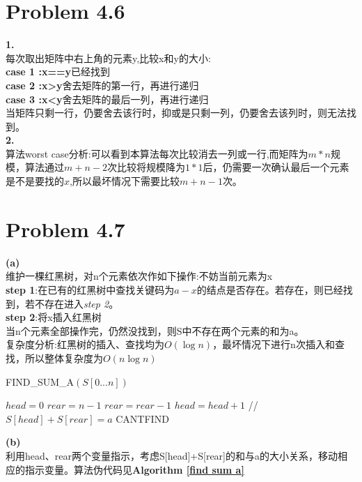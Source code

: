 \documentclass[twocolumn]{ctexart}
\begin{document}
\section*{Problem 4.6}
\noindent \textbf{1.}\\
\indent 每次取出矩阵中右上角的元素y,比较x和y的大小:\\
\indent \textbf{case 1 :x==y}已经找到\\
\indent \textbf{case 2 :x>y}舍去矩阵的第一行，再进行递归\\
\indent \textbf{case 3 :x<y}舍去矩阵的最后一列，再进行递归\\
\indent 当矩阵只剩一行，仍要舍去该行时，抑或是只剩一列，仍要舍去该列时，则无法找到。\\

\noindent \textbf{ 2.}\\
\indent 算法worst case分析:可以看到本算法每次比较消去一列或一行,而矩阵为$m*n$规模，算法通过$m+n-2$次比较将规模降为$1*1$后，仍需要一次确认最后一个元素是不是要找的$x$,所以最坏情况下需要比较$m+n-1$次。

\section*{Problem 4.7}
\noindent \textbf{(a)}\\
\indent 维护一棵红黑树，对n个元素依次作如下操作:不妨当前元素为x\\
\noindent \textbf{step 1}:在已有的红黑树中查找关键码为$a-x$的结点是否存在。若存在，则已经找到，若不存在进入\textit{step 2}。\\
\noindent \textbf{step 2}:将x插入红黑树\\
\indent 当n个元素全部操作完，仍然没找到，则S中不存在两个元素的和为a。\\
\indent 复杂度分析:红黑树的插入、查找均为$O(\log{n})$，最坏情况下进行n次插入和查找，所以整体复杂度为$O(n\log{n})$

\begin{algorithm}[htbp]
	\caption{FIND\_SUM\_A$(S[0...n])$}
	\label{find sum a}
	\begin{algorithmic}[1]
		\STATE $head=0$
		\STATE $rear=n-1$
				\STATE $rear=rear-1$
				\STATE $head=head+1$
			\ELSE 
				\STATE //$S[head]+S[rear]=a$ 
			\ENDIF
		\ENDWHILE
	\RETURN CANTFIND
	\end{algorithmic}
\end{algorithm}

\noindent \textbf{(b)}\\
\indent 利用head、rear两个变量指示，考虑S[head]+S[rear]的和与a的大小关系，移动相应的指示变量。算法伪代码见\textbf{Algorithm \ref{find sum a}}
\end{document}
